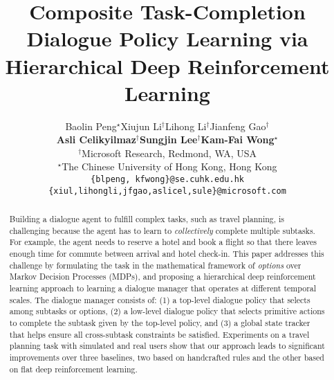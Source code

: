 \documentclass[11pt,letterpaper]{article}
\title{Composite Task-Completion Dialogue Policy Learning via \\ Hierarchical Deep Reinforcement Learning}
\author{Baolin Peng$^{\star}$\quad Xiujun Li$^{\dagger}$\quad Lihong Li$^{\dagger}$\quad Jianfeng Gao$^{\dagger}$\quad \\ 
\textbf{Asli Celikyilmaz$^\dagger$}\quad \textbf{Sungjin Lee$^\dagger$}\quad \textbf{Kam-Fai Wong$^{\star}$}\\
  $^{\dagger}$Microsoft Research, Redmond, WA, USA\\
  $^{\star}$The Chinese University of Hong Kong, Hong Kong \\
  {\tt \{blpeng, kfwong\}@se.cuhk.edu.hk} \\
  {\tt \{xiul,lihongli,jfgao,aslicel,sule\}@microsoft.com}
}
\date{}
\begin{document}
	
\maketitle
	
\begin{abstract}
Building a dialogue agent to fulfill complex tasks, such as travel planning, is challenging because the agent has to learn to \emph{collectively} complete multiple subtasks. For example, the agent needs to reserve a hotel and book a flight so that there leaves enough time for commute between arrival and hotel check-in. This paper addresses this challenge by formulating the task in the mathematical framework of \emph{options} over Markov Decision Processes (MDPs), and proposing a hierarchical deep reinforcement learning approach to learning a dialogue manager that operates at different temporal scales. The dialogue manager consists of: (1) a top-level dialogue policy that selects among subtasks or options, (2) a low-level dialogue policy that selects primitive actions to complete the subtask given by the top-level policy, and (3) a global state tracker that helps ensure all cross-subtask constraints be satisfied. Experiments on a travel planning task with simulated and real users show that our approach leads to significant improvements over three baselines, two based on handcrafted rules and the other based on flat deep reinforcement learning.




\end{abstract}
\end{document}
